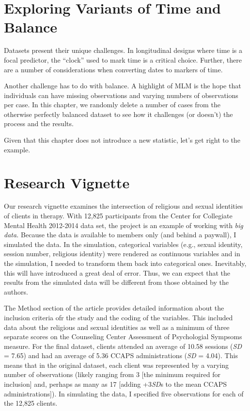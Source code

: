 \documentclass[
  11pt,
]{book}
\begin{document}
\hypertarget{exploring-variants-of-time-and-balance}{%
\section{Exploring Variants of Time and Balance}\label{exploring-variants-of-time-and-balance}}

Datasets present their unique challenges. In longitudinal designs where time is a focal predictor, the ``clock'' used to mark time is a critical choice. Further, there are a number of considerations when converting dates to markers of time.

Another challenge has to do with balance. A highlight of MLM is the hope that individuals can have missing observations and varying numbers of observations per case. In this chapter, we randomly delete a number of cases from the otherwise perfectly balanced dataset to see how it challenges (or doesn't) the process and the results.

Given that this chapter does not introduce a new statistic, let's get right to the example.

\hypertarget{research-vignette-3}{%
\section{Research Vignette}\label{research-vignette-3}}

Our research vignette \citep{lefevor_religious_2017} examines the intersection of religious and sexual identities of clients in therapy. With 12,825 participants from the Center for Collegiate Mental Health 2012-2014 data set, the project is an example of working with \emph{big data.} Because the data is available to members only (and behind a paywall), I simulated the data. In the simulation, categorical variables (e.g., sexual identity, session number, religious identity) were rendered as continuous variables and in the simulation, I needed to transform them back into categorical ones. Inevitably, this will have introduced a great deal of error. Thus, we can expect that the results from the simulated data will be different from those obtained by the authors.

The Method section of the article provides detailed information about the inclusion criteria ofr the study and the coding of the variables. This included data about the religious and sexual identities as well as a minimum of three separate scores on the Counseling Center Assessment of Psychologial Sympsoms \citep[CCAPS,][]{locke_development_2012} measure. For the final dataset, clients attended an average of 10.58 sessions (\emph{SD} = 7.65) and had an average of 5.36 CCAPS administrations (\emph{SD} = 4.04). This means that in the original dataset, each client was represented by a varying number of observations (likely ranging from 3 {[}the minimum required for inclusion{]} and, perhaps as many as 17 {[}adding +3\emph{SD}s to the mean CCAPS administrations{]}). In simulating the data, I specified five observations for each of the 12,825 clients.
\end{document}
